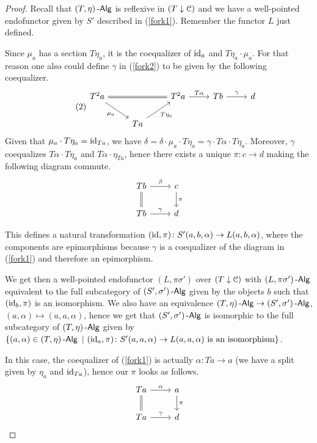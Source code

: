 \documentclass[a4paper,11pt,oneside,openany]{scrbook}
\begin{document}
\begin{proof}
	Recall that $(T,\eta)\operatorname{-\mathsf{Alg}}$ is reflexive in $(T\downarrow\operatorname{\mathcal{C}})$ and we have a
    well-pointed endofunctor given by $S'$ described in (\ref{fork1}). Remember
    the functor $L$ just defined.

	Since $\mu_a$ has a section $T\eta_a$, it is the coequalizer of $\operatorname{id}_a$ and
    $T\eta_a\cdot\mu_a$. For that reason one also could define $\gamma$ in
    (\ref{fork2}) to be
    given by the following coequalizer.
	\[
		\tag{2}\label{fork2}
		\begin{tikzcd}
			T^2a\ar[rr, equal]\ar[dr, swap, "\mu_a"]
			&& T^2a\ar[r, "T\alpha"]
			& Tb\ar[r, "\gamma"]
			& d \\
			& Ta\ar[ur, swap, "T\eta_a"]
		\end{tikzcd}
	\]
	Given that $\mu_a\cdot T\eta_a=\operatorname{id}_{Ta}$, we have
    $\delta=\delta\cdot\mu_a\cdot T\eta_a=\gamma\cdot T\alpha\cdot T\eta_a$.
    Moreover, $\gamma$ coequalizes $T\alpha\cdot T\eta_a$ and
    $T\alpha\cdot\eta_{Ta}$, hence there exists a unique $\pi\colon c\rightarrow
    d$ making the following diagram commute.
	\[
		\begin{tikzcd}
			Tb\ar[d, equal]\ar[r, "\beta"]
			& c\ar[d, "\pi"] \\
			Tb\ar[r, "\gamma"]
			& d
		\end{tikzcd}
	\]

	This defines a natural transformation $(\operatorname{id},\pi)\colon
    S'(a,b,\alpha)\rightarrow L(a,b,\alpha)$, where the components are
    epimorphisms because $\gamma$ is a coequalizer of the diagram in
    (\ref{fork1}) and therefore an epimorphism.

	We get then a well-pointed endofunctor $(L,\pi\sigma')$ over
    $(T\downarrow\operatorname{\mathcal{C}})$ with $(L,\pi\sigma')\operatorname{-\mathsf{Alg}}$ equivalent to the full
    subcategory of $(S',\sigma')\operatorname{-\mathsf{Alg}}$ given by the objects $b$ such that
    $(\operatorname{id}_b,\pi)$ is an isomorphism. We also have an equivalence
    $(T,\eta)\operatorname{-\mathsf{Alg}}\rightarrow (S',\sigma')\operatorname{-\mathsf{Alg}}$, $(a,\alpha)\mapsto
    (a,a,\alpha)$, hence we get that $(S',\sigma')\operatorname{-\mathsf{Alg}}$ is isomorphic to the
    full subcategory of $(T,\eta)\operatorname{-\mathsf{Alg}}$ given by $\{(a,\alpha)\in (T,\eta)\operatorname{-\mathsf{Alg}}\
    |\ (\operatorname{id}_a,\pi)\colon S'(a,a,\alpha)\rightarrow L(a,a,\alpha)\text{ is an
    isomorphism}\}$.

	In this case, the coequalizer of (\ref{fork1}) is actually $\alpha\colon
    Ta\rightarrow a$ (we have a split given by $\eta_{a}$ and $\operatorname{id}_{Ta}$), hence
    our $\pi$ looks as follows.
	\[
		\begin{tikzcd}
			Ta\ar[d, equal]\ar[r, "\alpha"]
			& a\ar[d, "\pi"] \\
			Ta\ar[r, "\gamma"]
			& d
		\end{tikzcd}
	\]


\end{proof}
\end{document}
